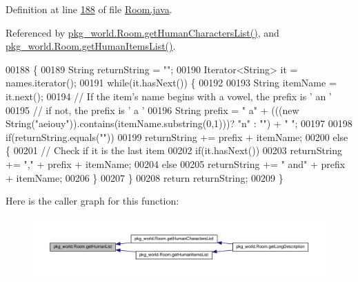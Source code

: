 Definition at line \hyperlink{Room_8java_source_l00188}{188} of file \hyperlink{Room_8java_source}{Room.\-java}.



Referenced by \hyperlink{Room_8java_source_l00179}{pkg\-\_\-world.\-Room.\-get\-Human\-Characters\-List()}, and \hyperlink{Room_8java_source_l00171}{pkg\-\_\-world.\-Room.\-get\-Human\-Items\-List()}.


\begin{DoxyCode}
00188                                                    \{
00189         String returnString = \textcolor{stringliteral}{""};
00190         Iterator<String> it = names.iterator();
00191         \textcolor{keywordflow}{while}(it.hasNext()) \{
00192 
00193             String itemName = it.next();
00194             \textcolor{comment}{// If the item's name begins with a vowel, the prefix is ' an '}
00195             \textcolor{comment}{// if not, the prefix is ' a '}
00196             String prefix = \textcolor{stringliteral}{" a"} + (((\textcolor{keyword}{new} String(\textcolor{stringliteral}{"aeiouy"})).contains(itemName.substring(0,1)))? \textcolor{stringliteral}{"n"} : \textcolor{stringliteral}{""}) +
       \textcolor{stringliteral}{" "};
00197 
00198             \textcolor{keywordflow}{if}(returnString.equals(\textcolor{stringliteral}{""}))
00199                 returnString += prefix + itemName;
00200             \textcolor{keywordflow}{else} \{
00201                 \textcolor{comment}{// Check if it is the last item}
00202                 \textcolor{keywordflow}{if}(it.hasNext())
00203                     returnString += \textcolor{stringliteral}{","} + prefix + itemName;
00204                 \textcolor{keywordflow}{else}
00205                     returnString += \textcolor{stringliteral}{" and"} + prefix + itemName;
00206             \}
00207         \}
00208         \textcolor{keywordflow}{return} returnString;
00209     \}
\end{DoxyCode}


Here is the caller graph for this function\-:
\nopagebreak
\begin{figure}[H]
\begin{center}
\leavevmode
\includegraphics[width=350pt]{classpkg__world_1_1Room_a178f912d90e1eb358fe60f7e5e708058_icgraph}
\end{center}
\end{figure}


